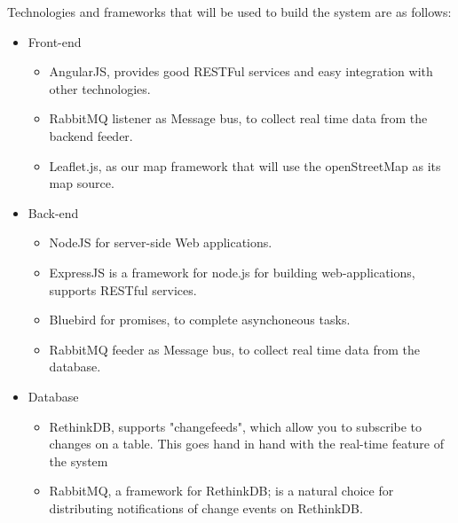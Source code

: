 Technologies and frameworks that will be used to build the system are as follows:
\begin{itemize}
\item Front-end
\begin{itemize}
	\item AngularJS, provides good RESTFul services and easy integration with other technologies.
	\item RabbitMQ listener as Message bus, to collect real time data from the backend feeder.
	\item Leaflet.js, as our map framework that will use the openStreetMap as its map source.
\end{itemize}
\item Back-end
\begin{itemize}
	\item NodeJS for server-side Web applications.
	\item ExpressJS is a framework for node.js for building web-applications, supports RESTful services.
	\item Bluebird for promises, to complete asynchoneous tasks.
	\item RabbitMQ feeder as Message bus, to collect real time data from the database.
\end{itemize}
\item Database
\begin{itemize}
	\item RethinkDB, supports "changefeeds", which allow you to subscribe to changes on a table. This goes hand in hand with the real-time feature of the system
	\item RabbitMQ, a framework for RethinkDB; is a natural choice for distributing notifications of change events on RethinkDB.
\end{itemize}

\end{itemize}
